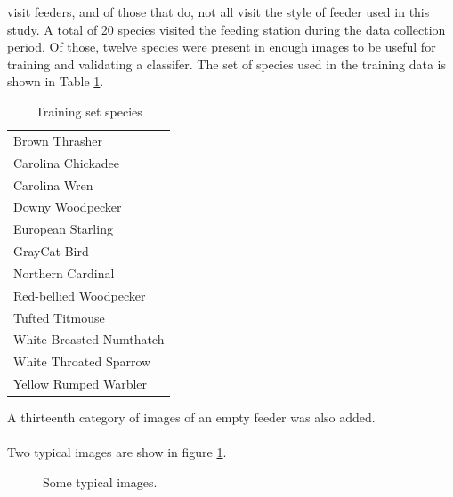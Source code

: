 \documentclass[11pt]{article}
\begin{document}
visit feeders, and of those that do, not all visit the style of
feeder used in this study. A total of 20 species visited
the feeding station during the data collection period. Of those,
twelve species were present in enough images to be useful for
training and validating a classifer. The set of species used in the
training data is shown in Table \ref{table:species}.
\begin{table}[H]
  \small
  \caption{Training set species}
  \label{table:species}
  \begin{center}
    \begin{tabular}{l}
      \hline
      Brown Thrasher \\ 
      Carolina Chickadee \\ 
      Carolina Wren \\ 
      Downy Woodpecker  \\
      European Starling\\
      GrayCat Bird\\ 
      Northern Cardinal \\ 
      Red-bellied Woodpecker \\ 
      Tufted Titmouse \\ 
      White Breasted Numthatch\\
      White Throated Sparrow\\
      Yellow Rumped Warbler \\ \hline
    \end{tabular}
  \end{center}
\end{table}
A thirteenth category of images of an empty feeder
was also added. \\ \\
Two typical images are show in figure \ref{fig:TypicalImages}.

\begin{figure}[H]
  \centering
  \hspace*{1em}
  \caption{Some typical images. \label{fig:TypicalImages}}
\end{figure}
\end{document}
